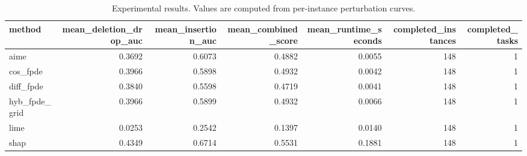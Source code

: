 \begin{table}[t]
\caption{Experimental results. Values are computed from per-instance perturbation curves.}
\label{tab:main_results_computed}
\centering
\begin{tabular}{lrrrrrr}
\toprule
method & mean\_deletion\_drop\_auc & mean\_insertion\_auc & mean\_combined\_score & mean\_runtime\_seconds & completed\_instances & completed\_tasks \\
\midrule
aime & 0.3692 & 0.6073 & 0.4882 & 0.0055 & 148 & 1 \\
cos\_fpde & 0.3966 & 0.5898 & 0.4932 & 0.0042 & 148 & 1 \\
diff\_fpde & 0.3840 & 0.5598 & 0.4719 & 0.0041 & 148 & 1 \\
hyb\_fpde\_grid & 0.3966 & 0.5899 & 0.4932 & 0.0066 & 148 & 1 \\
lime & 0.0253 & 0.2542 & 0.1397 & 0.0140 & 148 & 1 \\
shap & 0.4349 & 0.6714 & 0.5531 & 0.1881 & 148 & 1 \\
\bottomrule
\end{tabular}

\end{table}
